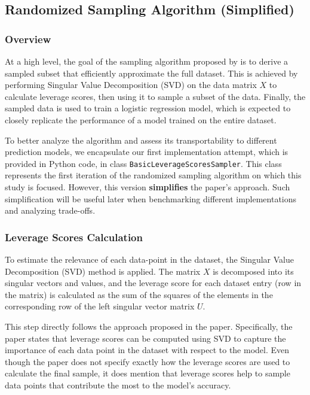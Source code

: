 \documentclass{article}
\theoremstyle{plain}
\theoremstyle{definition}
\theoremstyle{remark}
\begin{document}
\subsection{Randomized Sampling Algorithm (Simplified)}

\subsubsection{Overview}

At a high level, the goal of the sampling algorithm proposed by \citeauthor{chow24} is to derive a sampled subset that efficiently approximate the full dataset. This is achieved by performing Singular Value Decomposition (SVD) on the data matrix $X$ to calculate leverage scores, then using it to sample a subset of the data. Finally, the sampled data is used to train a logistic regression model, which is expected to closely replicate the performance of a model trained on the entire dataset.

To better analyze the algorithm and assess its transportability to different prediction models, we encapsulate our first implementation attempt, which is provided in Python code, in class \texttt{BasicLeverageScoresSampler}. This class represents the first iteration of the randomized sampling algorithm on which this study is focused. However, this version \textbf{simplifies} the paper's approach. Such simplification will be useful later when benchmarking different implementations and analyzing trade-offs.


\subsubsection{Leverage Scores Calculation}

To estimate the relevance of each data-point in the dataset, the Singular Value Decomposition (SVD) method is applied. The matrix $X$ is decomposed into its singular vectors and values, and the leverage score for each dataset entry (row in the matrix) is calculated as the sum of the squares of the elements in the corresponding row of the left singular vector matrix $U$.

This step directly follows the approach proposed in the paper. Specifically, the paper states that leverage scores can be computed using SVD to capture the importance of each data point in the dataset with respect to the model. Even though the paper does not specify exactly how the leverage scores are used to calculate the final sample, it does mention that leverage scores help to sample data points that contribute the most to the model’s accuracy.
\end{document}
